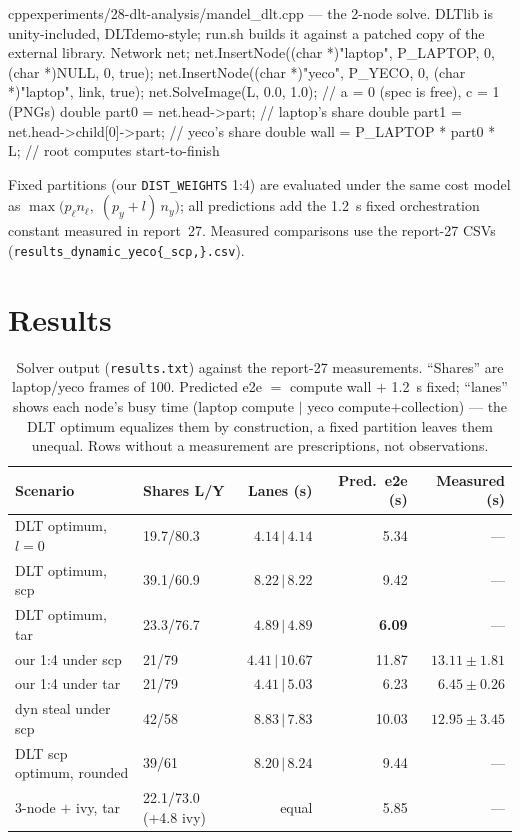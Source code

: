 \documentclass[
	english,
	letterpaper, oneside
]{article}
\begin{document}
\begin{sourcecode}{cpp}{experiments/28-dlt-analysis/mandel\_dlt.cpp --- the 2-node solve. DLTlib is unity-included, DLTdemo-style; run.sh builds it against a patched copy of the external library.}
Network net;
net.InsertNode((char *)"laptop", P_LAPTOP, 0, (char *)NULL, 0, true);
net.InsertNode((char *)"yeco",   P_YECO,   0, (char *)"laptop", link, true);
net.SolveImage(L, 0.0, 1.0);   // a = 0 (spec is free), c = 1 (PNGs)
double part0 = net.head->part;             // laptop's share
double part1 = net.head->child[0]->part;   // yeco's share
double wall  = P_LAPTOP * part0 * L;       // root computes start-to-finish
\end{sourcecode}

Fixed partitions (our \texttt{DIST\_WEIGHTS} 1:4) are evaluated under the
same cost model as
$\max\bigl(p_\ell n_\ell,\; (p_y + l)\, n_y\bigr)$; all predictions add
the 1.2~s fixed orchestration constant measured in report~27. Measured
comparisons use the report-27 CSVs
(\texttt{results\_dynamic\_yeco\{\_scp,\}.csv}).

\section{Results}
\label{sec:results}

\begin{table}[H]
\centering
\caption{Solver output (\texttt{results.txt}) against the report-27
measurements. ``Shares'' are laptop/yeco frames of 100. Predicted e2e $=$
compute wall $+$ 1.2~s fixed; ``lanes'' shows each node's busy time
(laptop compute $|$ yeco compute$+$collection) --- the DLT optimum
equalizes them by construction, a fixed partition leaves them unequal.
Rows without a measurement are prescriptions, not
observations.\label{tab:dlt}}
\footnotesize
\setlength{\tabcolsep}{4.5pt}
\begin{tabular}{llrrr}
\toprule
Scenario & Shares L/Y & Lanes (s) & Pred.\ e2e (s) & Measured (s) \\
\midrule
DLT optimum, $l=0$          & 19.7/80.3 & $4.14 \,|\, 4.14$ & 5.34 & --- \\
DLT optimum, scp            & 39.1/60.9 & $8.22 \,|\, 8.22$ & 9.42 & --- \\
DLT optimum, tar            & 23.3/76.7 & $4.89 \,|\, 4.89$ & \textbf{6.09} & --- \\
our 1:4 under scp           & 21/79     & $4.41 \,|\, 10.67$ & 11.87 & $13.11\pm1.81$ \\
our 1:4 under tar           & 21/79     & $4.41 \,|\, 5.03$ & 6.23 & $\mathbf{6.45\pm0.26}$ \\
dyn steal under scp         & 42/58     & $8.83 \,|\, 7.83$ & 10.03 & $12.95\pm3.45$ \\
DLT scp optimum, rounded    & 39/61     & $8.20 \,|\, 8.24$ & 9.44 & --- \\
3-node $+$ ivy, tar         & 22.1/73.0 (+4.8 ivy) & equal & 5.85 & --- \\
\bottomrule
\end{tabular}
\end{table}
\end{document}
